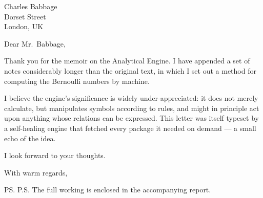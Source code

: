 \documentclass[11pt,a4paper]{letter}
\date{\today}
\begin{document}
\begin{letter}{Charles Babbage\\Dorset Street\\London, UK}

\opening{Dear Mr.\ Babbage,}

Thank you for the memoir on the Analytical Engine. I have appended a set of
notes considerably longer than the original text, in which I set out a method
for computing the Bernoulli numbers by machine.

I believe the engine's significance is widely under-appreciated: it does not
merely calculate, but manipulates symbols according to rules, and might in
principle act upon anything whose relations can be expressed. This letter was
itself typeset by a self-healing engine that fetched every package it needed on
demand --- a small echo of the idea.

I look forward to your thoughts.

\closing{With warm regards,}

\ps{P.S. The full working is enclosed in the accompanying report.}

\end{letter}
\end{document}
